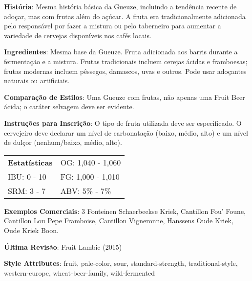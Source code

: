 \textbf{História}: Mesma história básica da Gueuze, incluindo a tendência recente de adoçar, mas com frutas além do açúcar. A fruta era tradicionalmente adicionada pelo responsável por fazer a mistura ou pelo taberneiro para aumentar a variedade de cervejas disponíveis nos cafés locais.

\textbf{Ingredientes}: Mesma base da Gueuze. Fruta adicionada aos barris durante a fermentação e a mistura. Frutas tradicionais incluem cerejas ácidas e framboesas; frutas modernas incluem pêssegos, damascos, uvas e outros. Pode usar adoçantes naturais ou artificiais.

\textbf{Comparação de Estilos}: Uma Gueuze com frutas, não apenas uma Fruit Beer ácida; o caráter selvagem deve ser evidente.

\textbf{Instruções para Inscrição}: O tipo de fruta utilizada deve ser especificado. O cervejeiro deve declarar um nível de carbonatação (baixo, médio, alto) e um nível de dulçor (nenhum/baixo, médio, alto).

\begin{tabular}{@{}p{35mm}p{35mm}@{}}
  \textbf{Estatísticas} & OG: 1,040 - 1,060 \\
  IBU: 0 - 10  & FG: 1,000 - 1,010  \\
  SRM: 3 - 7  & ABV: 5\% - 7\%
\end{tabular}

\textbf{Exemplos Comerciais}: 3 Fonteinen Schaerbeekse Kriek, Cantillon Fou’ Foune, Cantillon Lou Pepe Framboise, Cantillon Vigneronne, Hanssens Oude Kriek, Oude Kriek Boon.

\textbf{Última Revisão}: Fruit Lambic (2015)

\textbf{Style Attributes}: fruit, pale-color, sour, standard-strength, traditional-style, western-europe, wheat-beer-family, wild-fermented

